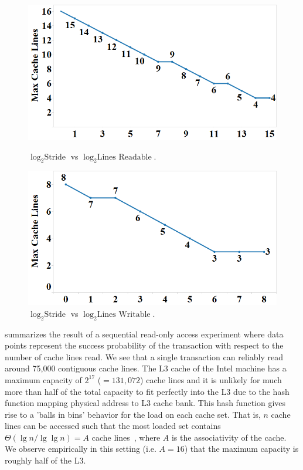 \begin{figure}[h]
\centering
\begin{minipage}[b]{.45\linewidth}
\centering
\includegraphics[width=\linewidth]{images/wttm_stride_read_intel}
\caption{$\log_2{\textrm{Stride}}$ vs $\log_2{\textrm{Lines Readable}}$.}
\label{fig:wttm_stride_read_intel}
\end{minipage}%
\quad
\begin{minipage}[b]{.45\linewidth}
\centering
\includegraphics[width=\linewidth]{images/wttm_stride_write_intel}
\caption{$\log_2{\textrm{Stride}}$ vs $\log_2{\textrm{Lines Writable}}$.}
\label{fig:wttm_stride_write_intel}
\end{minipage}
\end{figure}

 summarizes the result of a sequential
read-only access experiment where data points represent the success
probability of the transaction with respect to the 
number of cache lines read.  We see that a 
single transaction can reliably read 
around 75,000 contiguous cache lines. 
The {L3} cache of the Intel machine has a maximum
capacity of $2^{17}$ ($=131,072$) cache lines and it is unlikely
for much more than half of the total capacity to 
fit perfectly into the {L3} due to
the hash function mapping physical address to L3 cache bank.
This hash function gives rise to a
'balls in bins' behavior for the load on each cache set.  That is, 
$n$ cache lines can be accessed such that
the most loaded set contains $\Theta(\lg n / \lg \lg n) = A$ 
cache lines~\cite{Gonnet81}, where $A$ is the associativity of the cache. 
We observe empirically in this setting (i.e. $A=16$) that
the maximum capacity is roughly half of the {L3}.

